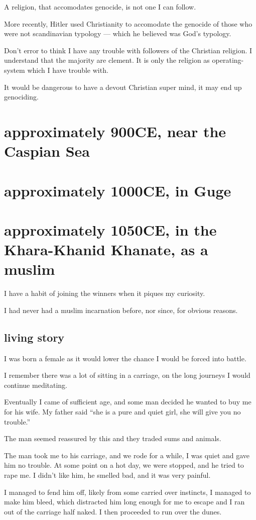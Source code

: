 A religion, that accomodates genocide, is not one I can follow.

More recently, Hitler used Christianity\cite{christianhitler} to accomodate 
the genocide of those who were not scandinavian typology --- which he believed
was God's typology.

Don't error to think I have any trouble with followers of the Christian
religion. I understand that the majority are clement. It is only the religion as
operating-system which I have trouble with.

It would be dangerous to have a devout Christian super mind,
it may end up genociding.
\chapter{approximately 900CE, near the Caspian Sea}
\chapter{approximately 1000CE, in Guge}
\chapter{approximately 1050CE, in the Khara-Khanid Khanate, as a muslim}
\label{reincarnation:muslim}
I have a habit of joining the winners when it piques my curiosity. 

I had never had a muslim incarnation before, nor since, for obvious reasons.

\section{living story}
I was born a female as it would lower the chance I would be forced into battle. 

I remember there was a lot of sitting in a carriage, on the long journeys I 
would continue meditating. 

Eventually I came of sufficient age, and some man decided he wanted to buy me
for his wife. My father said ``she is a pure and quiet girl, she will give you no
trouble.''

The man seemed reassured by this and they traded sums and animals.

The man took me to his carriage, and we rode for a while, I was quiet and gave
him no trouble. At some point on a hot day, we were stopped, and he tried to 
rape me. I didn't like him, he smelled bad, and it was very painful. 

I managed to fend him off, likely from some carried over instincts, I managed to
make him bleed, which distracted him long enough for me to escape and I ran out 
of the carriage half naked. I then proceeded to run over the dunes. 

